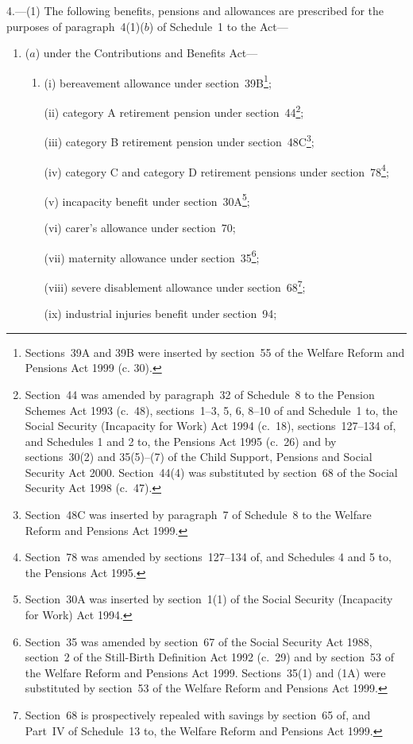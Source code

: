 \documentclass[12pt,a4paper]{article}
\begin{document}
4.---(1)  The following benefits, pensions and allowances are prescribed for the purposes of paragraph~4(1)($b$)  of Schedule~1 to the Act—
\begin{enumerate}\item[]
($a$) under the Contributions and Benefits Act—
\begin{enumerate}\item[]
(i) bereavement allowance under section~39B\footnote{\frenchspacing Sections~39A and 39B were inserted by section~55 of the Welfare Reform and Pensions Act 1999 (c. 30).};

(ii) category A retirement pension under section~44\footnote{Section~44 was amended by paragraph~32 of Schedule~8 to the Pension Schemes Act 1993 (c.\ 48), sections~1–3, 5, 6, 8–10 of and Schedule~1 to, the Social Security (Incapacity for Work) Act 1994 (c.\ 18), sections~127–134 of, and Schedules 1 and 2 to, the Pensions Act 1995 (c.\ 26) and by sections~30(2) and 35(5)–(7) of the Child Support, Pensions and Social Security Act 2000. Section~44(4) was substituted by section~68 of the Social Security Act 1998 (c.\ 47).};

(iii) category B retirement pension under section~48C\footnote{Section~48C was inserted by paragraph~7 of Schedule~8 to the Welfare Reform and Pensions Act 1999.};

(iv) category C and category D retirement pensions under section~78\footnote{Section~78 was amended by sections~127–134 of, and Schedules 4 and 5 to, the Pensions Act 1995.};

(v) incapacity benefit under section~30A\footnote{Section~30A was inserted by section~1(1) of the Social Security (Incapacity for Work) Act 1994.};

(vi) 
carer's allowance  %
under section~70;

(vii) maternity allowance under section~35\footnote{Section~35 was amended by section~67 of the Social Security Act 1988, section~2 of the Still-Birth Definition Act 1992 (c.\ 29) and by section~53 of the Welfare Reform and Pensions Act 1999. Sections~35(1) and (1A) were substituted by section~53 of the Welfare Reform and Pensions Act 1999.};

(viii) severe disablement allowance under section~68\footnote{Section~68 is prospectively repealed with savings by section~65 of, and Part~IV of Schedule~13 to, the Welfare Reform and Pensions Act 1999.};

(ix) industrial injuries benefit under section~94;


\end{enumerate}
\end{enumerate}
\end{document}
